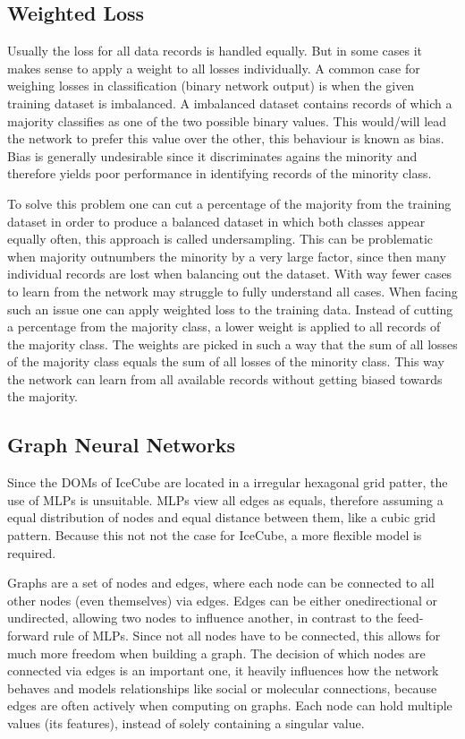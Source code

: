 \documentclass[a4paper,10pt]{scrartcl}
\begin{document}
\subsection{Weighted Loss}
\label{weighted-loss}

Usually the loss for all data records is handled equally.
But in some cases it makes sense to apply a weight to all losses individually.
A common case for weighing losses in classification (binary network output) is when the given training dataset is imbalanced.
A imbalanced dataset contains records of which a majority classifies as one of the two possible binary values.
This would/will lead the network to prefer this value over the other, this behaviour is known as bias.
Bias is generally undesirable since it discriminates agains the minority and therefore yields poor performance in identifying records of the minority class.

To solve this problem one can cut a percentage of the majority from the training dataset in order to produce a balanced dataset in which both classes appear equally often, this approach is called undersampling.
This can be problematic when majority outnumbers the minority by a very large factor, since then many individual records are lost when balancing out the dataset.
With way fewer cases to learn from the network may struggle to fully understand all cases.
When facing such an issue one can apply weighted loss to the training data.
Instead of cutting a percentage from the majority class, a lower weight is applied to all records of the majority class.
The weights are picked in such a way that the sum of all losses of the majority class equals the sum of all losses of the minority class.
This way the network can learn from all available records without getting biased towards the majority.

\subsection{Graph Neural Networks}
\label{gnns}

Since the DOMs of IceCube are located in a irregular hexagonal grid patter, the use of MLPs is unsuitable.
MLPs view all edges as equals, therefore assuming a equal distribution of nodes and equal distance between them, like a cubic grid pattern.
Because this not not the case for IceCube, a more flexible model is required.

Graphs are a set of nodes and edges, where each node can be connected to all other nodes (even themselves) via edges.
Edges can be either onedirectional or undirected, allowing two nodes to influence another, in contrast to the feed-forward rule of MLPs.
Since not all nodes have to be connected, this allows for much more freedom when building a graph.
The decision of which nodes are connected via edges is an important one, it heavily influences how the network behaves and models relationships like social or molecular connections, because edges are often actively when computing on graphs.
Each node can hold multiple values (its features), instead of solely containing a singular value.
\end{document}
